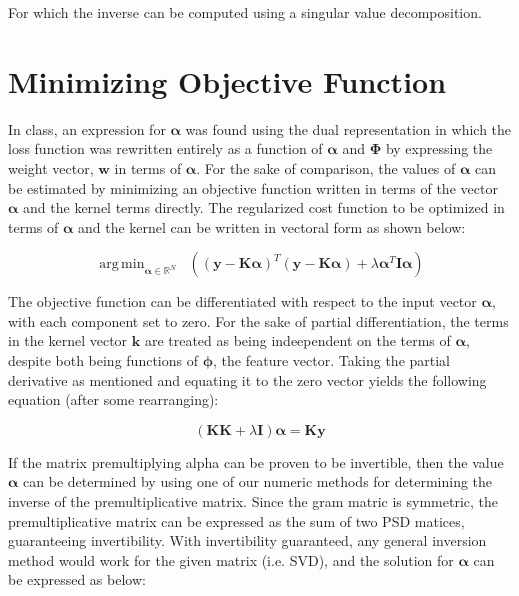 \documentclass{article}
\DeclareMathOperator*{\argmin}{arg\,min}
\begin{document}
For which the inverse can be computed using a singular value decomposition.

\section{Minimizing Objective Function}
In class, an expression for $\boldsymbol\alpha$ was found using the dual representation in which the loss function was rewritten entirely as a function of $\boldsymbol\alpha$ and $\mathbf{\Phi}$ by expressing the weight vector, $\mathbf{w}$ in terms of $\boldsymbol\alpha$. For the sake of comparison, the values of $\boldsymbol\alpha$ can be estimated by minimizing an objective function written in terms of the vector $\boldsymbol\alpha$ and the kernel terms directly. The regularized cost function to be optimized in terms of $\boldsymbol\alpha$ and the kernel can be written in vectoral form as shown below:

\begin{equation}
\argmin_{\boldsymbol\alpha \in \mathbb{R}^N} \;\; ( (\mathbf{y} - \mathbf{K}\boldsymbol\alpha)^T (\mathbf{y} - \mathbf{K}\boldsymbol\alpha) + \lambda \boldsymbol\alpha^T \mathbf{I} \boldsymbol\alpha)
\end{equation}

The objective function can be differentiated with respect to the input vector $\boldsymbol\alpha$, with each component set to zero. For the sake of partial differentiation, the terms in the kernel vector $\mathbf{k}$ are treated as being indeependent on the terms of $\boldsymbol\alpha$, despite both being functions of $\boldsymbol\phi$, the feature vector. Taking the partial derivative as mentioned and equating it to the zero vector yields the following equation (after some rearranging):

\begin{equation}
(\mathbf{K} \mathbf{K} + \lambda \mathbf{I}) \boldsymbol\alpha = \mathbf{Ky}
\end{equation}

If the matrix premultiplying alpha can be proven to be invertible, then the value $\boldsymbol\alpha$ can be determined by using one of our numeric methods for determining the inverse of the premultiplicative matrix. Since the gram matric is symmetric, the premultiplicative matrix can be expressed as the sum of two PSD matices, guaranteeing invertibility. With invertibility guaranteed, any general inversion method would work for the given matrix (i.e. SVD), and the solution for $\boldsymbol\alpha$ can be expressed as below:
\end{document}
